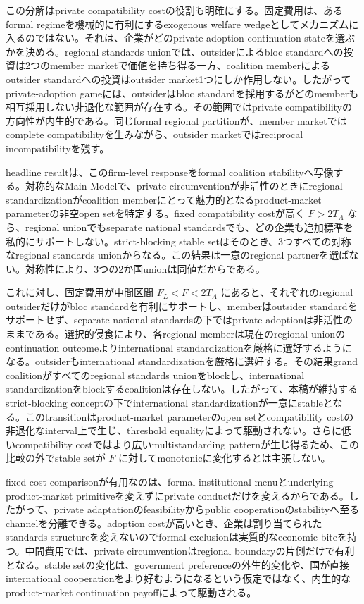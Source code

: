 この分解はprivate compatibility costの役割も明確にする。固定費用は、あるformal regimeを機械的に有利にするexogenous welfare wedgeとしてメカニズムに入るのではない。それは、企業がどのprivate-adoption continuation stateを選ぶかを決める。regional standards unionでは、outsiderによるbloc standardへの投資は2つのmember marketで価値を持ち得る一方、coalition memberによるoutsider standardへの投資はoutsider market1つにしか作用しない。したがってprivate-adoption gameには、outsiderはbloc standardを採用するがどのmemberも相互採用しない非退化な範囲が存在する。その範囲ではprivate compatibilityの方向性が内生的である。同じformal regional partitionが、member marketではcomplete compatibilityを生みながら、outsider marketではreciprocal incompatibilityを残す。

headline resultは、このfirm-level responseをformal coalition stabilityへ写像する。対称的なMain Modelで、private circumventionが非活性のときにregional standardizationがcoalition memberにとって魅力的となるproduct-market parameterの非空open setを特定する。fixed compatibility costが高く $F>2T_A$ なら、regional unionでもseparate national standardsでも、どの企業も追加標準を私的にサポートしない。strict-blocking stable setはそのとき、3つすべての対称なregional standards unionからなる。この結果は一意のregional partnerを選ばない。対称性により、3つの2か国unionは同値だからである。

これに対し、固定費用が中間区間 $F_L<F<2T_A$ にあると、それぞれのregional outsiderだけがbloc standardを有利にサポートし、memberはoutsider standardをサポートせず、separate national standardsの下ではprivate adoptionは非活性のままである。選択的侵食により、各regional memberは現在のregional unionのcontinuation outcomeよりinternational standardizationを厳格に選好するようになる。outsiderもinternational standardizationを厳格に選好する。その結果grand coalitionがすべてのregional standards unionをblockし、international standardizationをblockするcoalitionは存在しない。したがって、本稿が維持するstrict-blocking conceptの下でinternational standardizationが一意にstableとなる。このtransitionはproduct-market parameterのopen setとcompatibility costの非退化なinterval上で生じ、threshold equalityによって駆動されない。さらに低いcompatibility costではより広いmultistandarding patternが生じ得るため、この比較の外でstable setが $F$ に対してmonotonicに変化するとは主張しない。

fixed-cost comparisonが有用なのは、formal institutional menuとunderlying product-market primitiveを変えずにprivate conductだけを変えるからである。したがって、private adaptationのfeasibilityからpublic cooperationのstabilityへ至るchannelを分離できる。adoption costが高いとき、企業は割り当てられたstandards structureを変えないのでformal exclusionは実質的なeconomic biteを持つ。中間費用では、private circumventionはregional boundaryの片側だけで有利となる。stable setの変化は、government preferenceの外生的変化や、国が直接international cooperationをより好むようになるという仮定ではなく、内生的なproduct-market continuation payoffによって駆動される。

